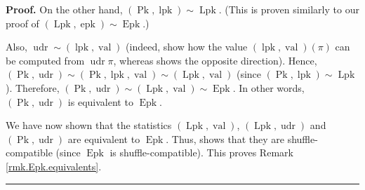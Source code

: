 \documentclass[numbers=enddot,12pt,final,onecolumn,notitlepage]{scrartcl}%
\theoremstyle{definition}
\newenvironment{proof}[1][Proof]{\noindent\textbf{#1.} }{\ \rule{0.5em}{0.5em}}
\newenvironment{verlong}{}{}
\begin{document}
\begin{proof}
On the other hand, $\left(  \operatorname*{Pk},\operatorname*{lpk}\right)
\sim\operatorname*{Lpk}$. (This is proven similarly to our proof of $\left(
\operatorname*{Lpk},\operatorname*{epk}\right)  \sim\operatorname{Epk}$.)

Also, $\operatorname*{udr}\sim\left(  \operatorname*{lpk},\operatorname{val}
\right)  $ (indeed, \cite[Lemma 2.2 \textbf{(b)} and \textbf{(c)}]{part1} show
how the value $\left(  \operatorname*{lpk},\operatorname{val}\right)  \left(
\pi\right)  $ can be computed from $\operatorname*{udr}\pi$, whereas
\cite[Lemma 2.2 \textbf{(a)}]{part1} shows the opposite direction). Hence,
$\left(  \operatorname*{Pk},\operatorname*{udr}\right)  \sim\left(
\operatorname*{Pk},\operatorname*{lpk},\operatorname{val}\right)  \sim\left(
\operatorname*{Lpk},\operatorname{val}\right)  $ (since $\left(
\operatorname*{Pk},\operatorname*{lpk}\right)  \sim\operatorname*{Lpk}$).
Therefore, $\left(  \operatorname*{Pk},\operatorname*{udr}\right)  \sim\left(
\operatorname*{Lpk},\operatorname{val}\right)  \sim\operatorname{Epk}$.
\begin{verlong}
In
other words, $\left(  \operatorname*{Pk},\operatorname*{udr}\right)  $ is
equivalent to $\operatorname{Epk}$.
\end{verlong}

We have now shown that the statistics $\left(  \operatorname{Lpk}%
,\operatorname{val}\right)  $, $\left(  \operatorname{Lpk}%
,\operatorname{udr}\right)  $ and $\left(  \operatorname*{Pk}%
,\operatorname{udr}\right)  $ are equivalent to $\operatorname{Epk}$. Thus,
\cite[Theorem 3.2]{part1} shows that they are shuffle-compatible (since
$\operatorname{Epk}$ is shuffle-compatible). This proves Remark
\ref{rmk.Epk.equivalents}.
\end{proof}
\end{document}
